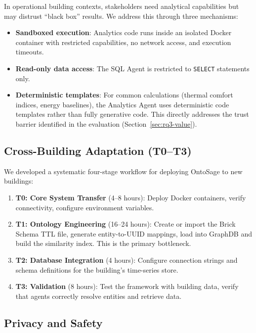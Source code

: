 \documentclass[acmsmall]{acmart}
\begin{document}
In operational building contexts, stakeholders need analytical capabilities but may distrust ``black box'' results. We address this through three mechanisms:
\begin{itemize}
    \item \textbf{Sandboxed execution}: Analytics code runs inside an isolated Docker container with restricted capabilities, no network access, and execution timeouts.
    \item \textbf{Read-only data access}: The SQL Agent is restricted to \texttt{SELECT} statements only.
    \item \textbf{Deterministic templates}: For common calculations (thermal comfort indices, energy baselines), the Analytics Agent uses deterministic code templates rather than fully generative code. This directly addresses the trust barrier identified in the evaluation (Section~\ref{sec:rq3-value}).
\end{itemize}

\subsection{Cross-Building Adaptation (T0--T3)}
\label{sec:adaptation}

We developed a systematic four-stage workflow for deploying OntoSage to new buildings:

\begin{enumerate}
    \item \textbf{T0: Core System Transfer} (4--8 hours): Deploy Docker containers, verify connectivity, configure environment variables.
    \item \textbf{T1: Ontology Engineering} (16--24 hours): Create or import the Brick Schema TTL file, generate entity-to-UUID mappings, load into GraphDB and build the similarity index. This is the primary bottleneck.
    \item \textbf{T2: Database Integration} (4 hours): Configure connection strings and schema definitions for the building's time-series store.
    \item \textbf{T3: Validation} (8 hours): Test the framework with building data, verify that agents correctly resolve entities and retrieve data.
\end{enumerate}

\subsection{Privacy and Safety}
\end{document}
